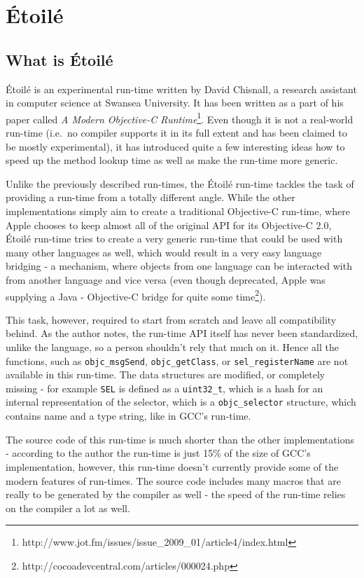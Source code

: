 \chapter{\'Etoil\'e}
\section{What is \'Etoil\'e}

\'Etoil\'e is an experimental run-time written by David Chisnall, a research assistant in computer science at Swansea University. It has been written as a part of his paper called \emph{A Modern Objective-C Runtime}\footnote{http://www.jot.fm/issues/issue\_2009\_01/article4/index.html}. Even though it is not a real-world run-time (i.e.\ no compiler supports it in its full extent and has been claimed to be mostly experimental), it has introduced quite a few interesting ideas how to speed up the method lookup time as well as make the run-time more generic.

Unlike the previously described run-times, the \'Etoil\'e run-time tackles the task of providing a run-time from a totally different angle. While the other implementations simply aim to create a traditional Objective-C run-time, where Apple chooses to keep almost all of the original API for its Objective-C 2.0, \'Etoil\'e run-time tries to create a very generic run-time that could be used with many other languages as well, which would result in a very easy language bridging - a mechanism, where objects from one language can be interacted with from another language and vice versa (even though deprecated, Apple was supplying a Java - Objective-C bridge for quite some time\footnote{http://cocoadevcentral.com/articles/000024.php}).

This task, however, required to start from scratch and leave all compatibility behind. As the author notes, the run-time API itself has never been standardized, unlike the language, so a person shouldn't rely that much on it. Hence all the functions, such as \verb=objc_msgSend=, \verb=objc_getClass=, or \verb=sel_registerName= are not available in this run-time. The data structures are modified, or completely missing - for example \verb=SEL= is defined as a \verb=uint32_t=, which is a hash for an internal representation of the selector, which is a \verb=objc_selector= structure, which contains name and a type string, like in GCC's run-time. 

The source code of this run-time is much shorter than the other implementations - according to the author the run-time is just 15\% of the size of GCC's implementation, however, this run-time doesn't currently provide some of the modern features of run-times. The source code includes many macros that are really to be generated by the compiler as well - the speed of the run-time relies on the compiler a lot as well.

